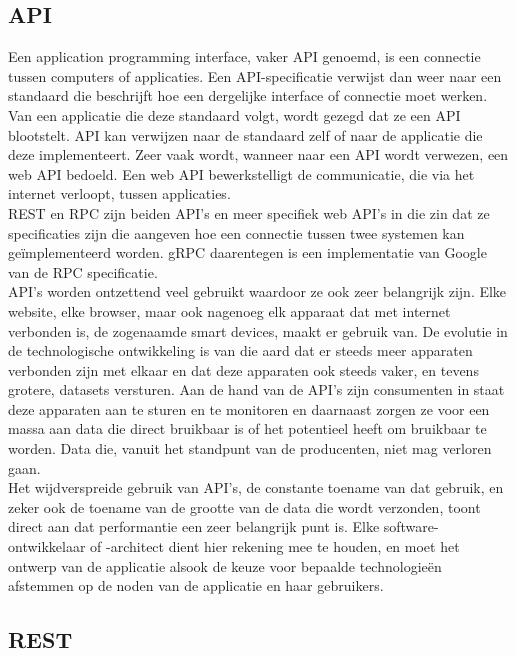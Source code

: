 \subsection{API}

Een application programming interface, vaker API genoemd, is een connectie tussen computers of applicaties.
Een API-specificatie verwijst dan weer naar een standaard die beschrijft hoe een dergelijke interface of connectie moet werken.
Van een applicatie die deze standaard volgt, wordt gezegd dat ze een API blootstelt. API kan verwijzen naar de standaard zelf of naar de applicatie die deze implementeert.
Zeer vaak wordt, wanneer naar een API wordt verwezen, een web API bedoeld. Een web API bewerkstelligt de communicatie, die via het internet verloopt, tussen applicaties.\\

REST en RPC zijn beiden API's en meer specifiek web API's in die zin dat ze specificaties zijn die aangeven hoe een connectie tussen twee systemen kan geïmplementeerd worden.
gRPC daarentegen is een implementatie van Google van de RPC specificatie.\\

API's worden ontzettend veel gebruikt waardoor ze ook zeer belangrijk zijn. Elke website, elke browser, maar ook nagenoeg elk apparaat dat met internet verbonden is,
de zogenaamde smart devices, maakt er gebruik van. De evolutie in de technologische ontwikkeling is van die aard dat er steeds meer apparaten verbonden zijn met elkaar
en dat deze apparaten ook steeds vaker, en tevens grotere, datasets versturen. Aan de hand van de API's zijn consumenten in staat deze apparaten aan te sturen en te monitoren
en daarnaast zorgen ze voor een massa aan data die direct bruikbaar is of het potentieel heeft om bruikbaar te worden. Data die, vanuit het standpunt van de producenten, niet mag verloren gaan.\\

Het wijdverspreide gebruik van API's, de constante toename van dat gebruik, en zeker ook de toename van de grootte van de data die wordt verzonden, toont
direct aan dat performantie een zeer belangrijk punt is. Elke software-ontwikkelaar of -architect dient hier rekening mee te houden, en moet het ontwerp van de
applicatie alsook de keuze voor bepaalde technologieën afstemmen op de noden van de applicatie en haar gebruikers.
~\autocite{cleo}

\subsection{REST}

